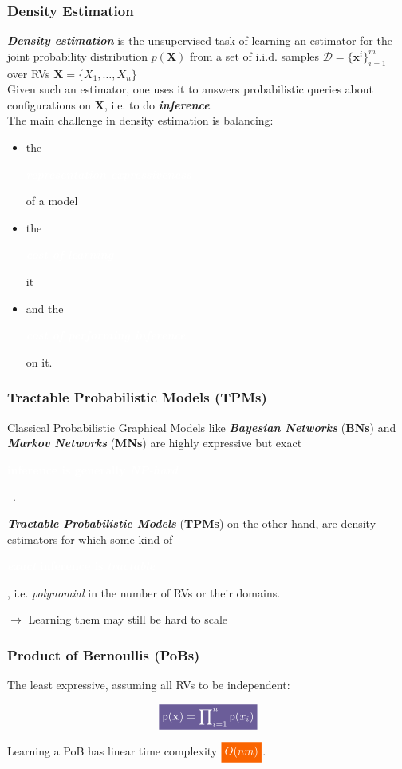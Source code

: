 \documentclass[xcolor={usenames,dvipsnames,svgnames}, compress]{beamer}
\newcommand{\highlight}[2][yellow]{\mathchoice%
  {\colorbox{#1}{\strut\textcolor{white}{$\displaystyle{#2}$}}}%
  {\colorbox{#1}{\strut\textcolor{white}{$\textstyle{#2}$}}}%
  {\colorbox{#1}{\strut\textcolor{white}{$\scriptstyle{#2}$}}}%
  {\colorbox{#1}{\strut\textcolor{white}{$\scriptscriptstyle{#2}$}}}}%
\newcommand{\highlighttext}[2][yellow]{{\colorbox{#1}{\strut\textcolor{white}{#2}}}}
\begin{document}
\begin{frame}[t]
  \frametitle{Density Estimation}
  \small
  \emph{\textbf{Density estimation}} is the unsupervised task of
    learning an estimator for the joint probability distribution
    $p(\mathbf{X})$ from a set of i.i.d. samples $\mathcal{D}=\{\mathbf
    x^i\}_{i=1}^m$ over RVs $\mathbf{X}=\{X_{1},\dots,X_{n}\}$\\[20pt]
    
    Given such an estimator, one uses it to answers
    probabilistic queries about configurations on $\mathbf{X}$,
    i.e. to do \emph{\textbf{inference}}.\\[20pt]

    The main challenge in density estimation is balancing:
    \begin{itemize}
      \setlength\itemsep{-3pt}
    \item the \highlighttext[lacamlilac]{\textbf{\emph{representation expressiveness}}} of a model
    \item the \highlighttext[gold4]{\textbf{\emph{cost of learning}}} it
      \item and the \highlighttext[petroil2]{\textbf{\emph{cost of performing inference}}} on it.
    \end{itemize}

\end{frame}

\begin{frame}[t]
  \frametitle{Tractable Probabilistic Models (TPMs)}

  \small
  Classical Probabilistic Graphical Models like \emph{\textbf{Bayesian Networks}}
    (\textbf{BNs}) and \emph{\textbf{Markov Networks}} (\textbf{MNs}) are highly expressive but
    exact \highlighttext[petroil2]{\textbf{inference is generally \emph{NP-hard}}}~\cite{Roth1996}.
    \vspace{20pt}

    
    \emph{\textbf{Tractable Probabilistic Models} }  (\textbf{TPMs})
    on the other hand, are density estimators for which some kind of  \highlighttext[petroil2]{\textbf{\emph{exact}} \textbf{inference is}
    \textbf{\emph{tractable}}}, i.e. \emph{polynomial} in the number of RVs or their
    domains.\par
    \hfill$\rightarrow$ Learning them may still be hard to scale\\[20pt]

  
  \end{frame}

  \begin{frame}[t]
    \frametitle{Product of Bernoullis (PoBs)}

    The least expressive, assuming all RVs to be independent:
    
    $$\highlight[lacamlilac]{\mathsf{p}(\mathbf{x}) =\prod\nolimits_{i=1}^{n}\mathsf{p}(x_{i})}$$

    Learning a PoB has linear time complexity $\highlight[gold4]{O(nm)}$.\par
    
  \end{frame}
\end{document}
